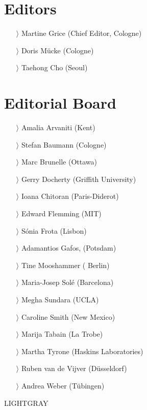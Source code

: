 \documentclass[
notumble,
nofoldmark,
]{leaflet}
\begin{document}
 
{
    \color{LIGHTGRAY}
\small
    \section{Editors}    

    \begin{itemize}
    \item[$\rangle$] Martine Grice (Chief Editor, Cologne)
    \item[$\rangle$] Doris M\"ucke (Cologne)
    \item[$\rangle$] Taehong Cho (Seoul)
    \end{itemize}

    \section{Editorial Board}    

    \begin{itemize}
    \item[$\rangle$] Amalia Arvaniti (Kent)
    \item[$\rangle$] Stefan Baumann (Cologne)
    \item[$\rangle$] Marc Brunelle (Ottawa)
    \item[$\rangle$] Gerry Docherty (Griffith University)
    \item[$\rangle$] Ioana Chitoran (Paris-Diderot)
    \item[$\rangle$] Edward Flemming (MIT)
    \item[$\rangle$] S\'onia Frota (Lisbon)
    \item[$\rangle$] Adamantios Gafos, (Potsdam)
    \item[$\rangle$] Tine Mooshammer ( Berlin)
    \item[$\rangle$] Maria-Josep Sol\'e (Barcelona)
    \item[$\rangle$] Megha Sundara (UCLA)
    \item[$\rangle$] Caroline Smith (New Mexico)
    \item[$\rangle$] Marija Tabain (La Trobe)
    \item[$\rangle$] Martha Tyrone (Haskins Laboratories)
    \item[$\rangle$] Ruben van de Vijver (D\"usseldorf)
    \item[$\rangle$] Andrea Weber (T\"ubingen) 
    \end{itemize}
}{LIGHTGRAY}
 
\end{document}
